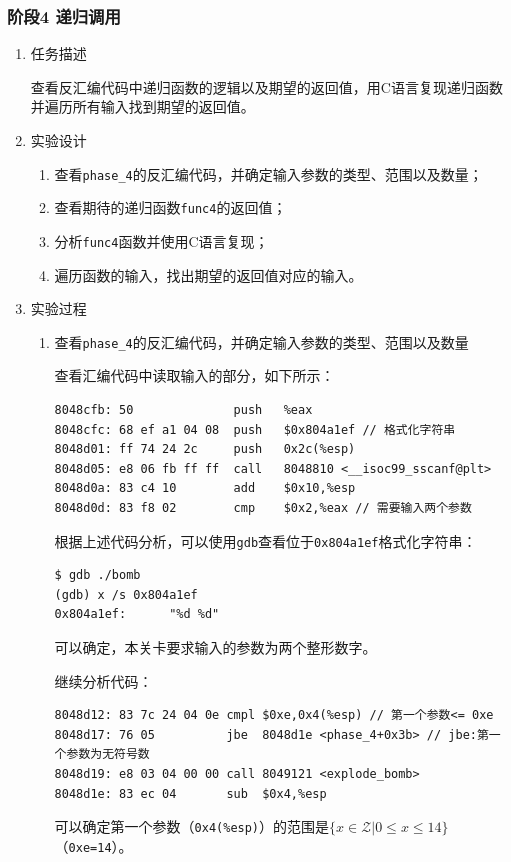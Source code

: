 \documentclass{paper}
\begin{document}
\subsubsection{阶段4 递归调用}
\begin{enumerate}
\item 任务描述

查看反汇编代码中递归函数的逻辑以及期望的返回值，用C语言复现递归函数并遍历所有输入找到期望的返回值。

\item 实验设计

\begin{enumerate}
\item 查看\verb|phase_4|的反汇编代码，并确定输入参数的类型、范围以及数量；
\item 查看期待的递归函数\verb|func4|的返回值；
\item 分析\verb|func4|函数并使用C语言复现；
\item 遍历函数的输入，找出期望的返回值对应的输入。
\end{enumerate}

\item 实验过程

\begin{enumerate}
\item 查看\verb|phase_4|的反汇编代码，并确定输入参数的类型、范围以及数量 \label{l2}

查看汇编代码中读取输入的部分，如下所示：
\begin{lstlisting}
8048cfb: 50              push   %eax
8048cfc: 68 ef a1 04 08  push   $0x804a1ef // 格式化字符串
8048d01: ff 74 24 2c     push   0x2c(%esp)
8048d05: e8 06 fb ff ff  call   8048810 <__isoc99_sscanf@plt>
8048d0a: 83 c4 10        add    $0x10,%esp
8048d0d: 83 f8 02        cmp    $0x2,%eax // 需要输入两个参数
\end{lstlisting}

根据上述代码分析，可以使用\verb|gdb|查看位于\verb|0x804a1ef|格式化字符串：
\begin{lstlisting}
$ gdb ./bomb
(gdb) x /s 0x804a1ef
0x804a1ef:      "%d %d"
\end{lstlisting}
可以确定，本关卡要求输入的参数为两个整形数字。

继续分析代码：
\begin{lstlisting}
8048d12: 83 7c 24 04 0e cmpl $0xe,0x4(%esp) // 第一个参数<= 0xe
8048d17: 76 05          jbe  8048d1e <phase_4+0x3b> // jbe:第一个参数为无符号数
8048d19: e8 03 04 00 00 call 8049121 <explode_bomb>
8048d1e: 83 ec 04       sub  $0x4,%esp
\end{lstlisting}
可以确定第一个参数（\verb|0x4(%esp)|）的范围是$\{x \in \mathcal{Z} | 0 \leq x \leq 14\}$（\verb|0xe=14|）。


\end{enumerate}
\end{enumerate}
\end{document}
